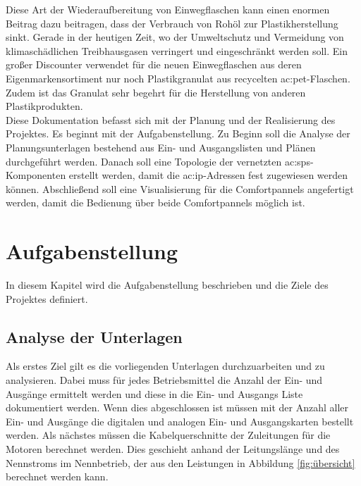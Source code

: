 Diese Art der Wiederaufbereitung von Einwegflaschen kann einen enormen Beitrag dazu beitragen, dass der Verbrauch von Rohöl zur Plastikherstellung sinkt. Gerade in der heutigen Zeit, wo der Umweltschutz und Vermeidung von klimaschädlichen Treibhausgasen verringert und eingeschränkt werden soll. Ein großer Discounter verwendet für die neuen Einwegflaschen aus deren Eigenmarkensortiment nur noch Plastikgranulat aus recycelten \gls{ac:pet}-Flaschen. Zudem ist das Granulat sehr begehrt für die Herstellung von anderen Plastikprodukten. \\
Diese Dokumentation befasst sich mit der Planung und der Realisierung des Projektes. Es beginnt mit der Aufgabenstellung. Zu Beginn soll die Analyse der Planungsunterlagen bestehend aus Ein- und Ausgangslisten und Plänen durchgeführt werden. Danach soll eine Topologie der vernetzten \gls{ac:sps}-Komponenten erstellt werden, damit die \gls{ac:ip}-Adressen fest zugewiesen werden können. Abschließend soll eine Visualisierung für die Comfortpannels angefertigt werden, damit die Bedienung über beide Comfortpannels möglich ist.

\chapter{Aufgabenstellung}

In diesem Kapitel wird die Aufgabenstellung beschrieben und die Ziele des Projektes definiert. 

\section{Analyse der Unterlagen}

Als erstes Ziel gilt es die vorliegenden Unterlagen durchzuarbeiten und zu analysieren. Dabei muss für jedes Betriebsmittel die Anzahl der Ein- und Ausgänge ermittelt werden und diese in die Ein- und Ausgangs Liste dokumentiert werden. Wenn dies abgeschlossen ist müssen mit der Anzahl aller Ein- und Ausgänge die digitalen und analogen Ein- und Ausgangskarten bestellt werden. Als nächstes müssen die Kabelquerschnitte der Zuleitungen für die Motoren berechnet werden. Dies geschieht anhand der Leitungslänge und des Nennstroms im Nennbetrieb, der aus den Leistungen in Abbildung \ref{fig:übersicht} berechnet werden kann. 

